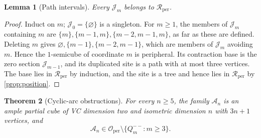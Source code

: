 \documentclass[11pt]{article}
\newtheorem{theorem}{Theorem}[section]
\newtheorem{lemma}[theorem]{Lemma}
\theoremstyle{definition}
\theoremstyle{remark}
\newcommand{\Rper}{\mathcal R_{\mathrm{per}}}
\newcommand{\Oper}{\mathcal O_{\mathrm{per}}}
\begin{document}
\begin{lemma}[Path intervals]
\label{lem:path-intervals}
Every \(\mathcal J_m\) belongs to \(\Rper\).
\end{lemma}

\begin{proof}
Induct on \(m\); \(\mathcal J_0=\{\varnothing\}\) is a singleton.  For
\(m\ge1\), the members of \(\mathcal J_m\) containing \(m\) are
\(\{m\},\{m-1,m\},\{m-2,m-1,m\}\), as far as these are defined.  Deleting
\(m\) gives \(\varnothing,\{m-1\},\{m-2,m-1\}\), which are members of
\(\mathcal J_m\) avoiding \(m\).  Hence the \(1\)-semicube of coordinate
\(m\) is peripheral.  Its contraction base is the zero section
\(\mathcal J_{m-1}\), and its duplicated site is a path with at most three
vertices.  The base lies in \(\Rper\) by induction, and the site is a tree
and hence lies in \(\Rper\) by \cref{prop:position}.
\end{proof}

\begin{theorem}[Cyclic-arc obstructions]
\label{thm:cyclic-arcs}
For every \(n\ge5\), the family \(\mathcal A_n\) is an ample partial cube of
VC dimension two and isometric dimension \(n\) with \(3n+1\) vertices, and
\[
 \mathcal A_n\in\Oper\setminus\{Q_m^{--}:m\ge3\}.
\]
\end{theorem}
\end{document}
